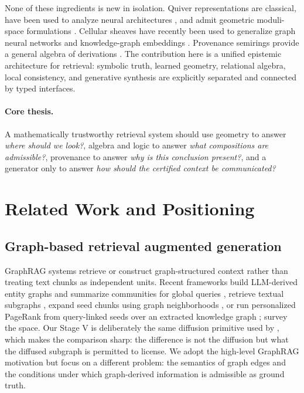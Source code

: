 \documentclass[11pt]{article}
\begin{document}
None of these ingredients is new in isolation. Quiver representations are classical, have been used to analyze neural architectures \citep{armenta2020,ganev2022}, and admit geometric moduli-space formulations \citep{jeffreys2021}. Cellular sheaves have recently been used to generalize graph neural networks and knowledge-graph embeddings \citep{hansen2020,gebhart2023,braithwaite2024}. Provenance semirings provide a general algebra of derivations \citep{green2007,grahne2020}. The contribution here is a unified epistemic architecture for retrieval: symbolic truth, learned geometry, relational algebra, local consistency, and generative synthesis are explicitly separated and connected by typed interfaces.

\paragraph{Core thesis.} A mathematically trustworthy retrieval system should use geometry to answer \emph{where should we look?}, algebra and logic to answer \emph{what compositions are admissible?}, provenance to answer \emph{why is this conclusion present?}, and a generator only to answer \emph{how should the certified context be communicated?}

\section{Related Work and Positioning}

\subsection{Graph-based retrieval augmented generation}
GraphRAG systems retrieve or construct graph-structured context rather than treating text chunks as independent units. Recent frameworks build LLM-derived entity graphs and summarize communities for global queries \citep{edge2024}, retrieve textual subgraphs \citep{hu2024}, expand seed chunks using graph neighborhoods \citep{zhu2025}, or run personalized PageRank from query-linked seeds over an extracted knowledge graph \citep{gutierrez2024}; \citet{han2025} survey the space. Our Stage V is deliberately the same diffusion primitive used by \citet{gutierrez2024}, which makes the comparison sharp: the difference is not the diffusion but what the diffused subgraph is permitted to license. We adopt the high-level GraphRAG motivation but focus on a different problem: the semantics of graph edges and the conditions under which graph-derived information is admissible as ground truth.
\end{document}
